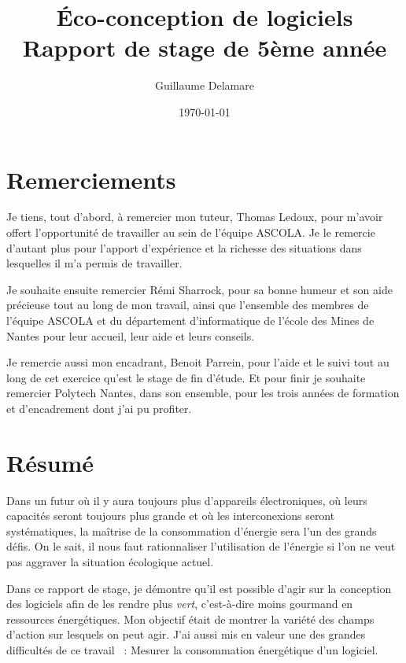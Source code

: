 \documentclass[a4paper, 11pt]{report}
\title{Éco-conception de logiciels\\ \large Rapport de stage de 5ème année}
\author{Guillaume Delamare}
\date{\today}
\begin{document}
\renewcommand{\labelitemi}{$\bullet$}
\renewcommand{\labelitemii}{$\diamond$}
\renewcommand{\labelitemiii}{$\ast$}
\renewcommand{\labelitemiv}{$\cdot$}

\maketitle

\section*{Remerciements}
Je tiens, tout d'abord, à remercier mon tuteur, Thomas Ledoux, pour m'avoir offert l'opportunité de travailler au sein de l'équipe ASCOLA. Je le remercie d'autant plus pour l'apport d'expérience et la richesse des situations dans lesquelles il m'a permis de travailler.

Je souhaite ensuite remercier Rémi Sharrock, pour sa bonne humeur et son aide précieuse tout au long de mon travail, ainsi que l'ensemble des membres de l'équipe ASCOLA et du département d'informatique de l'école des Mines de Nantes pour leur accueil, leur aide et leurs conseils.

Je remercie aussi mon encadrant, Benoit Parrein, pour l'aide et le suivi tout au long de cet exercice qu'est le stage de fin d'étude. Et pour finir je souhaite remercier Polytech Nantes, dans son ensemble, pour les trois années de formation et d'encadrement dont j'ai pu profiter.

\newpage

\section*{Résumé}
Dans un futur où il y aura toujours plus d'appareils électroniques, où leurs capacités seront toujours plus grande et où les interconexions seront systématiques, la maîtrise de la consommation d'énergie sera l'un des grands défis. On le sait, il nous faut rationnaliser l'utilisation de l'énergie si l'on ne veut pas aggraver la situation écologique actuel.

Dans ce rapport de stage, je démontre qu'il est possible d'agir sur la conception des logiciels afin de les rendre plus \textit{vert}, c'est-à-dire moins gourmand en ressources énergétiques. Mon objectif était de montrer la variété des champs d'action sur lesquels on peut agir. J'ai aussi mis en valeur une des grandes difficultés de ce travail ~: Mesurer la consommation énergétique d'un logiciel.
\end{document}
